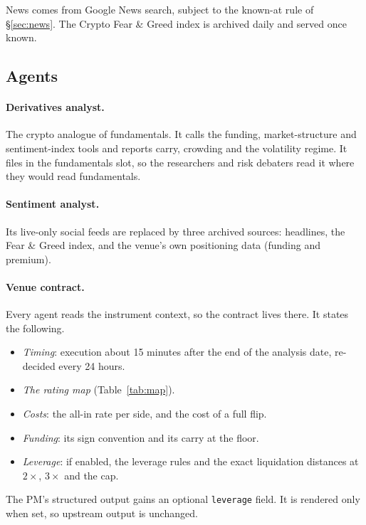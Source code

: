 \documentclass[11pt]{article}
\theoremstyle{remark}
\begin{document}
News comes from Google News search, subject to the known-at rule of \S\ref{sec:news}. The Crypto Fear \& Greed index \citep{alternativefng} is archived daily and served once known.

\subsection{Agents}
\paragraph{Derivatives analyst.} The crypto analogue of fundamentals. It calls the funding, market-structure and sentiment-index tools and reports carry, crowding and the volatility regime. It files in the fundamentals slot, so the researchers and risk debaters read it where they would read fundamentals.

\paragraph{Sentiment analyst.} Its live-only social feeds are replaced by three archived sources: headlines, the Fear \& Greed index, and the venue's own positioning data (funding and premium).

\paragraph{Venue contract.} Every agent reads the instrument context, so the contract lives there. It states the following.
\begin{itemize}
\item \emph{Timing}: execution about 15 minutes after the end of the analysis date, re-decided every 24 hours.
\item \emph{The rating map} (Table~\ref{tab:map}).
\item \emph{Costs}: the all-in rate per side, and the cost of a full flip.
\item \emph{Funding}: its sign convention and its carry at the floor.
\item \emph{Leverage}: if enabled, the leverage rules and the exact liquidation distances at $2\times$, $3\times$ and the cap.
\end{itemize}
The PM's structured output gains an optional \texttt{leverage} field. It is rendered only when set, so upstream output is unchanged.
\end{document}
